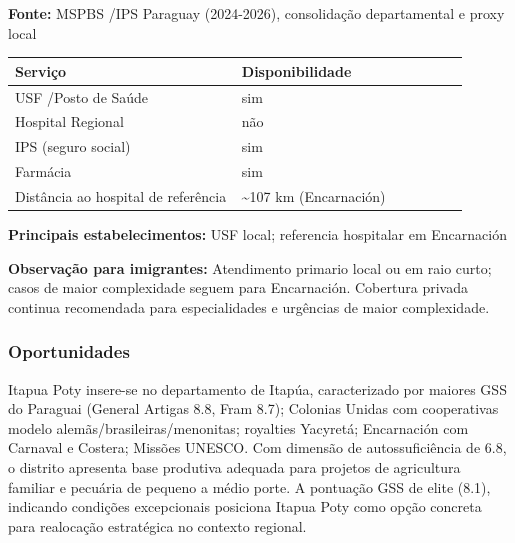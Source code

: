 \textbf{Fonte:} MSPBS /\allowbreak  IPS Paraguay (2024-2026), consolidação
departamental e proxy local

{\def\LTcaptype{none} %
\begin{longtable}{@{}>{\raggedright\arraybackslash}p{0.45\linewidth} >{\raggedright\arraybackslash}p{0.45\linewidth}@{}}
\toprule\noalign{}
Serviço & Disponibilidade \\
\midrule\noalign{}
\endhead
\bottomrule\noalign{}
\endlastfoot
USF /\allowbreak  Posto de Saúde & sim \\
Hospital Regional & não \\
IPS (seguro social) & sim \\
Farmácia & sim \\
Distância ao hospital de referência & \textasciitilde107 km
(Encarnación) \\
\end{longtable}
}

\textbf{Principais estabelecimentos:} USF local; referencia hospitalar
em Encarnación

\textbf{Observação para imigrantes:} Atendimento primario local ou em
raio curto; casos de maior complexidade seguem para Encarnación.
Cobertura privada continua recomendada para especialidades e urgências
de maior complexidade.
\newpage

\subsubsection*{Oportunidades}\label{oport-itapua-poty-0730}
Itapua Poty insere-se no departamento de Itapúa, caracterizado por maiores GSS do Paraguai (General Artigas 8.8, Fram 8.7); Colonias Unidas com cooperativas modelo alemãs/brasileiras/menonitas; royalties Yacyretá; Encarnación com Carnaval e Costera; Missões UNESCO. Com dimensão de autossuficiência de 6.8, o distrito apresenta base produtiva adequada para projetos de agricultura familiar e pecuária de pequeno a médio porte. A pontuação GSS de elite (8.1), indicando condições excepcionais posiciona Itapua Poty como opção concreta para realocação estratégica no contexto regional.

